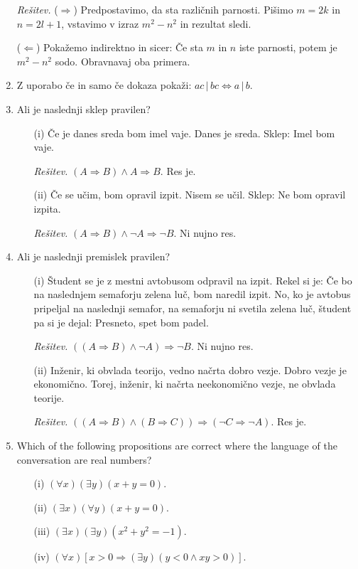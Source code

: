 \documentclass[11pt,paper=b5,footinclude,headinclude]{scrbook} %
\theoremstyle{remark}
\theoremstyle{definition} %
\theoremstyle{theorem} %
\begin{document}
\begin{enumerate}
\emph{ Rešitev.} ($\Rightarrow$) Predpostavimo, da sta različnih parnosti. Pišimo  $m=2k$ in $n=2l+1$, vstavimo v izraz $m^2- n^2$ in rezultat sledi.

($\Leftarrow$) Pokažemo indirektno in sicer: Če sta $m$ in $n$ iste parnosti, potem je $m^2- n^2$ sodo. Obravnavaj oba primera.


\item Z uporabo če in samo če dokaza pokaži: $ac\,|\,bc \Leftrightarrow a\,|\,b$.

\item Ali je naslednji sklep pravilen?
\begin{enumerate}
\item[(i)] Če je danes sreda bom imel vaje. Danes je sreda. Sklep: Imel bom vaje.

\emph{ Rešitev.} $(A\Rightarrow B) \wedge A \Rightarrow B$. Res je.

\item[(ii)] Če se učim, bom opravil izpit. Nisem se učil. Sklep: Ne bom opravil izpita.

\emph{ Rešitev.} $(A\Rightarrow B) \wedge \neg A \Rightarrow \neg B$. Ni nujno res.
\end{enumerate}

\item Ali je naslednji premislek pravilen?
\begin{enumerate}
\item[(i)] Študent se je z mestni avtobusom odpravil na izpit. Rekel si je: Če bo na naslednjem semaforju zelena luč, bom naredil izpit. No, ko je avtobus pripeljal na naslednji semafor, na semaforju ni svetila zelena luč, študent pa si je dejal: Presneto, spet bom padel.

\emph{ Rešitev.} $((A\Rightarrow B) \wedge \neg A) \Rightarrow \neg B$. Ni nujno res.

\item[(ii)] Inženir, ki obvlada teorijo, vedno načrta dobro vezje. Dobro vezje je ekonomično. Torej, inženir, ki načrta neekonomično vezje, ne obvlada teorije. 

\emph{ Rešitev.} $((A\Rightarrow B) \wedge (B\Rightarrow C)) \Rightarrow (\neg C \Rightarrow \neg A)$. Res je.
\end{enumerate}





\item Which of the following propositions are correct where the language of the conversation are real numbers?
\begin{enumerate}
\item[(i)] $(\forall x)(\exists y)(x+y=0)$.
\item[(ii)] $(\exists x)(\forall y)(x+y=0)$.
\item[(iii)] $(\exists x)(\exists y)(x^2+y^2 =-1)$.
\item[(iv)] $(\forall x)[x>0 \Rightarrow (\exists y)(y<0 \wedge xy>0)]$.
\end{enumerate} 
\end{enumerate} 
\end{document}
